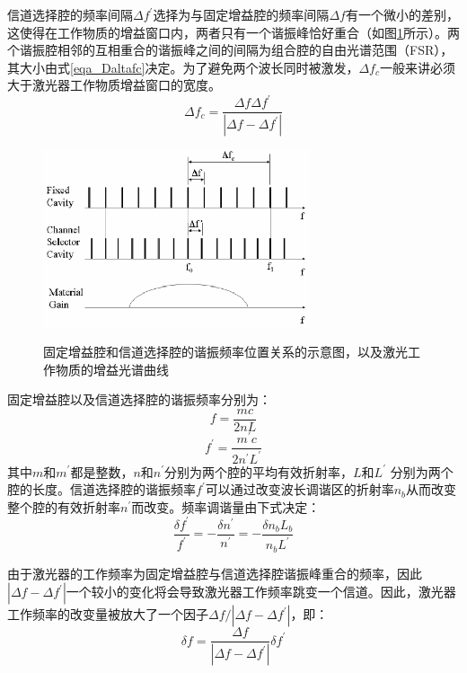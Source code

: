 \documentclass[oneside]{ZJUthesis}
\begin{document}
信道选择腔的频率间隔$\Delta f ^\prime$选择为与固定增益腔的频率间隔$\Delta f$有一个微小的差别，这使得在工作物质的增益窗口内，两者只有一个谐振峰恰好重合（如图\ref{fig_Deltaf}所示）。两个谐振腔相邻的互相重合的谐振峰之间的间隔为组合腔的自由光谱范围（FSR），其大小由式\ref{eqa_Daltafc}决定。为了避免两个波长同时被激发，$\Delta f_c$一般来讲必须大于激光器工作物质增益窗口的宽度。
\begin{equation}\label{eqa_Daltafc}
  \Delta f_c = \frac{\Delta f \Delta f^\prime}{|\Delta f-\Delta f^\prime|}
\end{equation}
\begin{figure}[!h]
  \centering
  \includegraphics[width=0.7\textwidth]{./Pictures/deltaf.eps}\\
  \caption{固定增益腔和信道选择腔的谐振频率位置关系的示意图，以及激光工作物质的增益光谱曲线}
  \label{fig_Deltaf}
\end{figure}

固定增益腔以及信道选择腔的谐振频率分别为：
\begin{equation}
  f = \frac{mc}{2nL}
\end{equation}
\begin{equation}
  f^\prime = \frac{m^\prime c}{2n^\prime L^\prime}
\end{equation}
其中$m$和$m^\prime$都是整数，$n$和$n^\prime$分别为两个腔的平均有效折射率，$L$和$L^\prime$ 分别为两个腔的长度。信道选择腔的谐振频率$f^\prime$可以通过改变波长调谐区的折射率$n_b$从而改变整个腔的有效折射率$n^\prime$而改变。频率调谐量由下式决定：
\begin{equation}
  \frac{\delta f^\prime}{f^\prime} = -\frac{\delta n^\prime}{n^\prime}=-\frac{\delta n_b L_b}{n_b L^\prime}
\end{equation}

由于激光器的工作频率为固定增益腔与信道选择腔谐振峰重合的频率，因此$|\Delta f-\Delta f^\prime|$一个较小的变化将会导致激光器工作频率跳变一个信道。因此，激光器工作频率的改变量被放大了一个因子$\Delta f/|\Delta f-\Delta f^\prime|$，即：
\begin{equation}
  \delta f = \frac{\Delta f}{|\Delta f-\Delta f^\prime|} \delta f^\prime
\end{equation}
\end{document}
